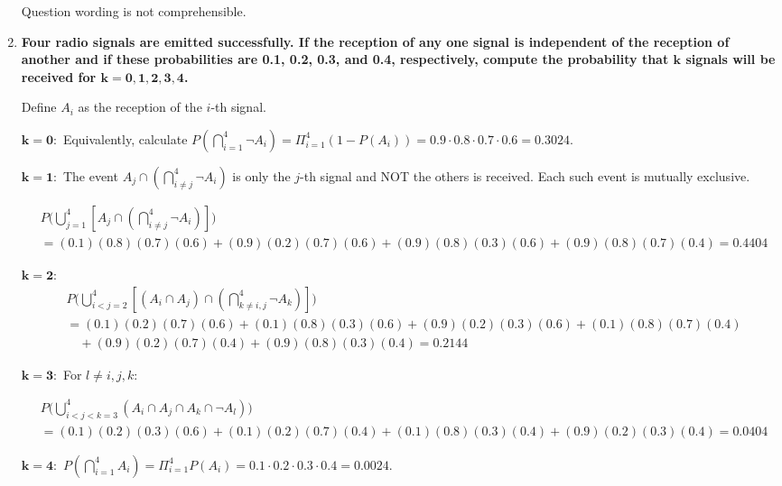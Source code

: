 \documentclass[10pt, oneside]{article}   	%
\theoremstyle{definition}
\begin{document}
\begin{enumerate}[label=3.\arabic*]
Question wording is not comprehensible.

\item  \begin{tcolorbox}[
  colback=Cerulean!5!white,
  colframe=Cerulean!75!black]
\textbf{Four radio signals are emitted successfully. If the reception of any one signal is independent of the reception of another and if these probabilities are 0.1, 0.2, 0.3, and 0.4, respectively, compute the probability that $\bm{k}$ signals will be received for $\bm{k = 0, 1, 2, 3, 4}$.}
\end{tcolorbox}

Define $A_i$ as the reception of the $i$-th signal.

$\bm{k = 0}:$ Equivalently, calculate $P(\bigcap^4_{i=1} \neg A_i) = \Pi^4_{i = 1} (1 - P(A_i)) = 0.9 \cdot 0.8 \cdot 0.7 \cdot 0.6 = \boxed{0.3024}$.

$\bm{k = 1}:$ The event $A_j \cap ( \bigcap^4_{i \neq j} \neg A_i )$ is only the $j$-th signal and NOT the others is received. Each such event is mutually exclusive.

\begin{align*}
&P\Bigg( \bigcup^4_{j = 1} [ A_j \cap ( \bigcap^4_{i \neq j} \neg A_i ) ] \Bigg) \\
&= (0.1)(0.8)(0.7)(0.6) + (0.9)(0.2)(0.7)(0.6) + (0.9)(0.8)(0.3)(0.6) + (0.9)(0.8)(0.7)(0.4) = \boxed{0.4404}
\end{align*}

$\bm{k = 2}:$ 
\begin{align*}
&P\Bigg( \bigcup^4_{i < j = 2} [ (A_i \cap A_j) \cap ( \bigcap^4_{k \neq i, j} \neg A_k) ] \Bigg) \\
&= (0.1)(0.2)(0.7)(0.6) + (0.1)(0.8)(0.3)(0.6) + (0.9)(0.2)(0.3)(0.6) + (0.1)(0.8)(0.7)(0.4) \\
&\quad + (0.9)(0.2)(0.7)(0.4) + (0.9)(0.8)(0.3)(0.4) = \boxed{0.2144}
\end{align*}

$\bm{k = 3}:$ For $l \neq i, j, k$:

\begin{align*}
&P\Bigg( \bigcup^4_{i < j < k = 3} (A_i \cap A_j \cap A_k \cap \neg A_l) \Bigg) \\
&= (0.1)(0.2)(0.3)(0.6) + (0.1)(0.2)(0.7)(0.4) + (0.1)(0.8)(0.3)(0.4) + (0.9)(0.2)(0.3)(0.4) = \boxed{0.0404}
\end{align*}

$\bm{k = 4}:$ $P(\bigcap^4_{i=1} A_i) = \Pi^4_{i = 1} P(A_i) = 0.1 \cdot 0.2 \cdot 0.3 \cdot 0.4 = \boxed{0.0024}$.


\end{enumerate}
\end{document}
